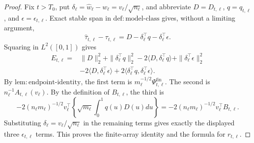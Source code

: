 \documentclass{article}
\begin{document}
\begin{proof}
Fix \(t>T_0\), put \(\delta_\ell=\widehat w_\ell-w_\ell=v_\ell/\sqrt{n_\ell}\), and abbreviate \(D=D_{t,\ell}\), \(q=q_{t,\ell}\), and \(\epsilon=\epsilon_{t,\ell}\).  Exact stable span in \(\mathrm{def:model\mbox{-}class}\) gives, without a limiting argument,
\[
 \widehat\tau_{t,\ell}-\tau_{t,\ell}
 =D-\delta_\ell^\top q-\delta_\ell^\top\epsilon.
\]
Squaring in \(L^2([0,1])\) gives
\[
\begin{aligned}
 E_{t,\ell}={}&\|D\|_2^2+\|\delta_\ell^\top q\|_2^2
 -2\langle D,\delta_\ell^\top q\rangle
 +\|\delta_\ell^\top\epsilon\|_2^2\\
 &-2\langle D,\delta_\ell^\top\epsilon\rangle
 +2\langle\delta_\ell^\top q,\delta_\ell^\top\epsilon\rangle.
\end{aligned}
\]
By \(\mathrm{lem:endpoint\mbox{-}identity}\), the first term is
\(m_\ell^{-1/2}\Psi^{\mathrm{fin}}_{t,\ell}\).  The second is
\(n_\ell^{-1}A_{t,\ell}(v_\ell)\).  By the definition of \(B_{t,\ell}\), the third is
\[
 -2(n_\ell m_\ell)^{-1/2}v_\ell^\top
 \left\{\sqrt{m_\ell}\int_0^1q(u)D(u)du\right\}
 =-2(n_\ell m_\ell)^{-1/2}v_\ell^\top B_{t,\ell}.
\]
Substituting \(\delta_\ell=v_\ell/\sqrt{n_\ell}\) in the remaining terms gives exactly the displayed three \(\epsilon_{t,\ell}\) terms.  This proves the finite-array identity and the formula for \(r_{t,\ell}\).


\end{proof}
\end{document}
